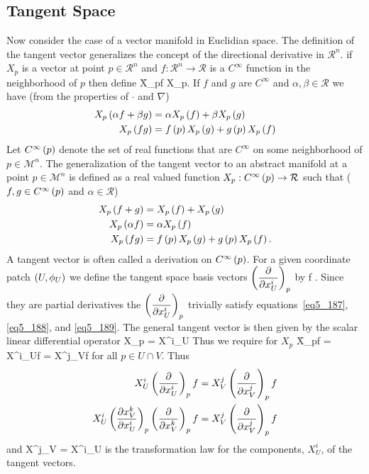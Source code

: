 \subsection{Tangent Space}
Now consider the case of a vector manifold in Euclidian space.  The definition of the tangent vector generalizes the concept of the directional derivative
in $\mathcal{R}^{n}$. if $X_{p}$ is a vector at point $p \in \mathcal{R}^{n}$ and $f:\mathcal{R}^{n}\rightarrow\mathcal{R}$ is a $C^{\infty}$ function in
the neighborhood of $p$ then define
\be
	\f{X_{p}}{f} \equiv X_{p}\cdot{}.
\ee
If $f$ and $g$ are $C^{\infty}$ and $\alpha,\beta \in \mathcal{R}$ we have (from the properties of $\cdot$ and $\nabla$)
\begin{align}
	{X_{p}}\left ( {\alpha f+\beta g} \right ) &= \alpha{X_{p}}\left ( {f} \right ) + \beta {X_{p}}\left ( {g} \right ) \\
	{X_{p}}\left ( {fg} \right ) &= {f}\left ( {p} \right ){X_{p}}\left ( {g} \right ) + {g}\left ( {p} \right ){X_{p}}\left ( {f} \right )
\end{align}
Let ${C^{\infty}}\left ( {p} \right )$ denote the set of real functions that are $C^{\infty}$ on some neighborhood of $p \in \mathcal{M}^{n}$. The generalization 
of the tangent vector to an abstract manifold at a point $p \in \mathcal{M}^{n}$ is defined as a real valued function $X_{p}: {C^{\infty}}\left ( {p} \right )\rightarrow\mathcal{R}$
such that ($f,g \in {C^{\infty}}\left ( {p} \right )$ and $\alpha \in \mathcal{R}$)
\begin{align} 
	{X_{p}}\left ( {f+g} \right ) &= {X_{p}}\left ( {f} \right )+{X_{p}}\left ( {g} \right ) \label{eq5_187}\\
	{X_{p}}\left ( {\alpha f} \right ) &= \alpha{X_{p}}\left ( {f} \right ) \label{eq5_188}\\
	{X_{p}}\left ( {fg} \right ) &= {f}\left ( {p} \right ){X_{p}}\left ( {g} \right )+{g}\left ( {p} \right ){X_{p}}\left ( {f} \right ).\label{eq5_189}
\end{align}
A tangent vector is often called a derivation on ${C^{\infty}}\left ( {p} \right )$.  For a given coordinate patch $\left ( {U,\phi_{U}} \right )$ we define the tangent space basis
vectors $\left ( {\displaystyle\frac{\partial{}}{\partial{x^{i}_{U}}}} \right )_{p}$ by 
\be\label{eq5_190}
	f \equiv {}.
\ee
Since they are partial derivatives the $\left ( {\displaystyle\frac{\partial{}}{\partial{x^{i}_{U}}}}\right )_{p}$ trivially satisfy equations~\ref{eq5_187}, \ref{eq5_188}, and \ref{eq5_189}.  The
general tangent vector is then given by the scalar linear differential operator
\be
	X_{p} = X^{i}_{U}
\ee
Thus we require for $X_{p}$
\be
	\f{X_{p}}{f} = X^{i}_{U}f = X^{j}_{V}f
\ee
for all $p \in U\cap V$.  Thus
\begin{align}
	X^{i}_{U}\left ( {\displaystyle\frac{\partial{}}{\partial{x^{i}_{U}}}}\right )_{p}f &= X^{j}_{V}\left ( {\displaystyle\frac{\partial{}}{\partial{x^{j}_{V}}}}\right )_{p}f \\
	X^{i}_{U}\left ( {\displaystyle\frac{\partial{x^{k}_{V}}}{\partial{x^{i}_{U}}}}\right )_{p}\left ( {\displaystyle\frac{\partial{}}{\partial{x^{k}_{V}}}}\right )_{p}f &= X^{j}_{V}\left ( {\displaystyle\frac{\partial{}}{\partial{x^{j}_{V}}}}\right )_{p}f
\end{align}
and
\be\label{eq5_195}
	X^{j}_{V} = X^{i}_{U}
\ee
is the transformation law for the components, $X^{i}_{U}$, of the tangent vectors.

